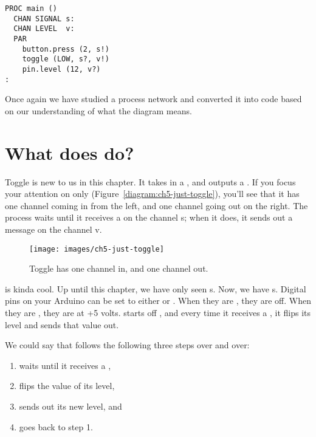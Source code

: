 \vspace{3mm}
\begin{lstlisting}
PROC main ()
  CHAN SIGNAL s:
  CHAN LEVEL  v:
  PAR
    button.press (2, s!)
    toggle (LOW, s?, v!)
    pin.level (12, v?)
:
\end{lstlisting}

Once again we have studied a process network and converted it into code based on our understanding of what the diagram means. 

\section{What does \toggle do?}

Toggle is new to us in this chapter. It takes in a \SIGNALT, and outputs a \LEVELT. If you focus your attention on \toggle only (Figure~\vref{diagram:ch5-just-toggle}), you'll see that it has one channel coming in from the left, and one channel going out on the right. The \toggle process waits until it receives a \SIGNALV on the channel {\code s}; when it does, it sends out a message on the channel {\code v}. 

\begin{figure}[ht]
  \begin{center}
    \texttt{[image: images/ch5-just-toggle]}
    \caption{Toggle has one channel in, and one channel out.}
    \label{diagram:ch5-just-toggle}
  \end{center}
\end{figure}

\toggle is kinda cool. Up until this chapter, we have only seen {\SIGNALT}s. Now, we have {\LEVELT}s. Digital pins on your Arduino can be set to either \HIGH or \LOW. When they are \LOW, they are off. When they are \HIGH, they are at +5 volts. \toggle starts off \LOW, and every time it receives a \SIGNALT, it flips its level and sends that value out. 

\newpage

We could say that \toggle follows the following three steps over and over:

\vspace{3mm}
\begin{enumerate}
	\item \toggle waits until it receives a \SIGNALT, 
	\item flips the value of its level,
	\item sends out its new level, and 
	\item goes back to step 1.
\end{enumerate}

